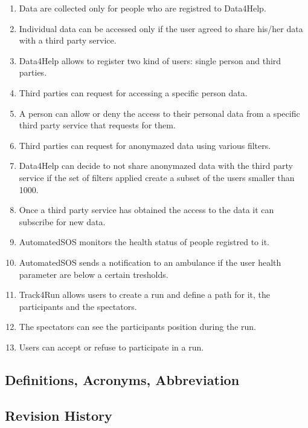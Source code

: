 \documentclass[a4paper]{article}
\begin{document}
\begin{enumerate}
	
	
	\item Data are collected only for people who are registred to Data4Help.
	\item Individual data can be accessed only if the user agreed to share his/her data with a third party service.
	\item Data4Help allows to register two kind of users: single person and third parties.
	\item Third parties can request for accessing a specific person data.
	\item A person can allow or deny the access to their personal data from a specific third party service that requests for them.
	\item Third parties can request for anonymazed data using various filters.
	\item Data4Help can decide to not share anonymazed data with the third party service if the set of filters applied create a subset of the users smaller than 1000.
	\item Once a third party service has obtained the access to the data it can subscribe for new data.
	
	\item AutomatedSOS monitors the health status of people registred to it.
	\item AutomatedSOS sends a notification to an ambulance if the user health parameter are below a certain tresholds. 
	
	\item Track4Run allows users to create a run and define a path for it, the participants and the spectators.
	\item The spectators can see the participants position during the run.
	\item Users can accept or refuse to participate in a run.
	
\end{enumerate}

\subsection{Definitions, Acronyms, Abbreviation}

\subsection{Revision History}
\end{document}
